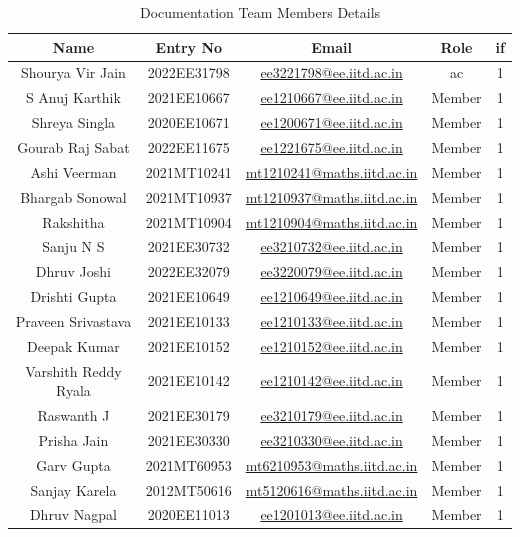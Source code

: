\documentclass[12pt]{article} %
\begin{document}
\begin{table}[h!]
\centering
\begin{tabular}{|c|c|c|c|c|}
\hline
Name & Entry No & Email & Role & \acrshort{if} \\
\hline
Shourya Vir Jain & 2022EE31798 & \href{mailto:ee3221798@ee.iitd.ac.in}{ee3221798@ee.iitd.ac.in} & \acrshort{ac} & 1 \\
S Anuj Karthik & 2021EE10667 & \href{mailto:ee1210667@ee.iitd.ac.in}{ee1210667@ee.iitd.ac.in} & Member & 1 \\
Shreya Singla & 2020EE10671 & \href{mailto:ee1200671@ee.iitd.ac.in}{ee1200671@ee.iitd.ac.in} & Member & 1 \\
Gourab Raj Sabat & 2022EE11675 & \href{mailto:ee1221675@ee.iitd.ac.in}{ee1221675@ee.iitd.ac.in} & Member & 1 \\
Ashi Veerman & 2021MT10241 & \href{mailto:mt1210241@maths.iitd.ac.in}{mt1210241@maths.iitd.ac.in} & Member & 1 \\
Bhargab Sonowal & 2021MT10937 & \href{mailto:mt1210937@maths.iitd.ac.in}{mt1210937@maths.iitd.ac.in} & Member & 1 \\
Rakshitha & 2021MT10904 & \href{mailto:mt1210904@maths.iitd.ac.in}{mt1210904@maths.iitd.ac.in} & Member & 1 \\
Sanju N S & 2021EE30732 & \href{mailto:ee3210732@ee.iitd.ac.in}{ee3210732@ee.iitd.ac.in} & Member & 1 \\
Dhruv Joshi & 2022EE32079 & \href{mailto:ee3222079@ee.iitd.ac.in}{ee3220079@ee.iitd.ac.in} & Member & 1 \\
Drishti Gupta & 2021EE10649 & \href{mailto:ee1210649@ee.iitd.ac.in}{ee1210649@ee.iitd.ac.in} & Member & 1 \\
Praveen Srivastava & 2021EE10133 & \href{mailto:ee1210133@ee.iitd.ac.in}{ee1210133@ee.iitd.ac.in} & Member & 1 \\
Deepak Kumar & 2021EE10152 & \href{mailto:ee1210152@ee.iitd.ac.in}{ee1210152@ee.iitd.ac.in} & Member & 1 \\
Varshith Reddy Ryala & 2021EE10142 & \href{mailto:ee1210142@ee.iitd.ac.in}{ee1210142@ee.iitd.ac.in} & Member & 1 \\
Raswanth J & 2021EE30179 & \href{mailto:ee3210179@ee.iitd.ac.in}{ee3210179@ee.iitd.ac.in} & Member & 1 \\
Prisha Jain & 2021EE30330 & \href{mailto:ee3210330@ee.iitd.ac.in}{ee3210330@ee.iitd.ac.in} & Member & 1 \\
Garv Gupta & 2021MT60953 & \href{mailto:mt6210953@maths.iitd.ac.in}{mt6210953@maths.iitd.ac.in} & Member & 1 \\
Sanjay Karela & 2012MT50616 & \href{mailto:mt5120616@maths.iitd.ac.in}{mt5120616@maths.iitd.ac.in} & Member & 1 \\
Dhruv Nagpal & 2020EE11013 & \href{mailto:ee1201013@ee.iitd.ac.in}{ee1201013@ee.iitd.ac.in} & Member & 1 \\
\hline
\end{tabular}
\caption{Documentation Team Members Details}
\label{tab:teamDetails}
\end{table}
\end{document}
